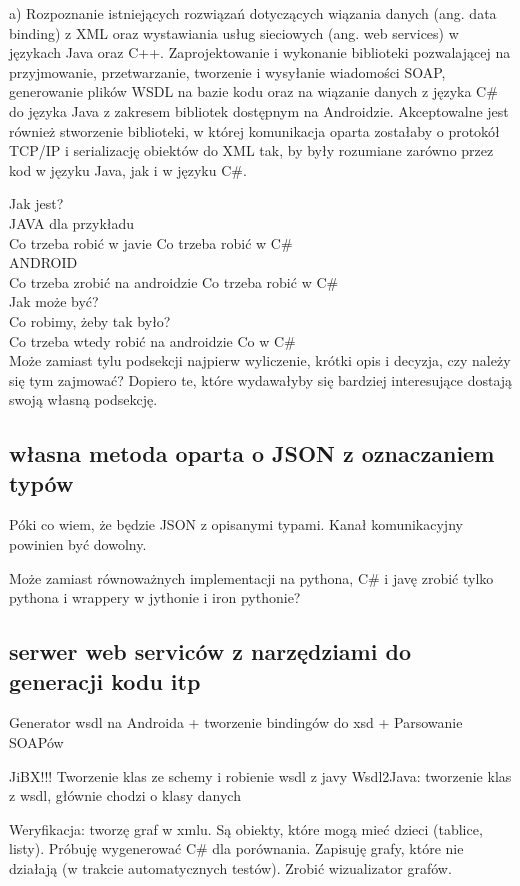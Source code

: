 \documentclass[twoside,a4paper]{book}
\begin{document}
a)	Rozpoznanie istniejących rozwiązań dotyczących wiązania danych (ang. data binding) z XML oraz wystawiania usług sieciowych (ang. web services) w językach Java oraz C++.
Zaprojektowanie i wykonanie biblioteki pozwalającej na przyjmowanie, przetwarzanie, tworzenie i wysyłanie wiadomości SOAP, generowanie plików WSDL na bazie kodu oraz na wiązanie danych z języka C\# do języka Java z zakresem bibliotek dostępnym na Androidzie. Akceptowalne jest również stworzenie biblioteki, w której komunikacja oparta zostałaby o protokół TCP/IP i serializację obiektów do XML tak, by były rozumiane zarówno przez kod w języku Java, jak i w języku C\#.

Jak jest? \\
JAVA dla przykładu \\
Co trzeba robić w javie			Co trzeba robić w C\# \\
ANDROID \\
Co trzeba zrobić na androidzie		Co trzeba robić w C\# \\

Jak może być? \\
Co robimy, żeby tak było? \\
Co trzeba wtedy robić na androidzie	Co w C\# \\

Może zamiast tylu podsekcji najpierw wyliczenie, krótki opis i decyzja, czy należy się tym zajmować? Dopiero te, które wydawałyby się bardziej interesujące dostają swoją własną podsekcję.

\subsection{własna metoda oparta o JSON z oznaczaniem typów}
Póki co wiem, że będzie JSON z opisanymi typami. Kanał komunikacyjny powinien być dowolny. 

Może zamiast równoważnych implementacji na pythona, C\# i javę zrobić tylko pythona i wrappery w jythonie i iron pythonie?

\subsection{serwer web serviców z narzędziami do generacji kodu itp}
Generator wsdl na Androida + tworzenie bindingów do xsd + Parsowanie SOAPów

JiBX!!! Tworzenie klas ze schemy i robienie wsdl z javy
Wsdl2Java: tworzenie klas z wsdl, głównie chodzi o klasy danych

Weryfikacja: tworzę graf w xmlu. Są obiekty, które mogą mieć dzieci (tablice, listy). Próbuję wygenerować C\# dla porównania. Zapisuję grafy, które nie działają (w trakcie automatycznych testów). Zrobić wizualizator grafów.
\end{document}
